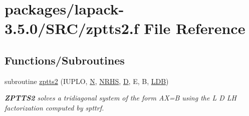 \hypertarget{zptts2_8f}{}\section{packages/lapack-\/3.5.0/\+S\+R\+C/zptts2.f File Reference}
\label{zptts2_8f}
\subsection*{Functions/\+Subroutines}
\begin{DoxyCompactItemize}
\item 
subroutine \hyperlink{group__complex16PTcomputational_ga216beeac0fe239f03d9b37f51e96d7c7}{zptts2} (I\+U\+P\+L\+O, \hyperlink{polmisc_8c_a0240ac851181b84ac374872dc5434ee4}{N}, \hyperlink{example__user_8c_aa0138da002ce2a90360df2f521eb3198}{N\+R\+H\+S}, \hyperlink{odrpack_8h_a7dae6ea403d00f3687f24a874e67d139}{D}, E, B, \hyperlink{example__user_8c_a50e90a7104df172b5a89a06c47fcca04}{L\+D\+B})
\begin{DoxyCompactList}\small\item\em {\bfseries Z\+P\+T\+T\+S2} solves a tridiagonal system of the form A\+X=B using the L D L\+H factorization computed by spttrf. \end{DoxyCompactList}\end{DoxyCompactItemize}
